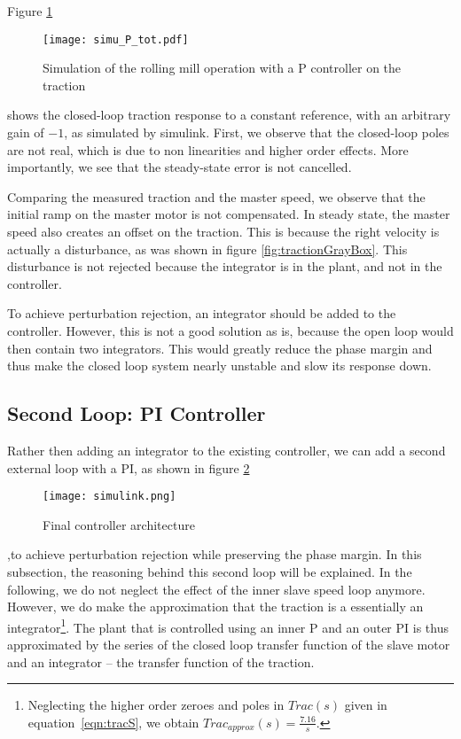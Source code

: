 Figure \ref{fig:simuPTot}
\begin{figure}[htbp]
  \centering
  \texttt{[image: simu\_P\_tot.pdf]}
  \caption{Simulation of the rolling mill operation with a P controller on the traction\label{fig:simuPTot}}
\end{figure}
shows the closed-loop traction response to a constant reference, with an arbitrary gain of $-1$, as simulated by simulink. First, we observe that the closed-loop poles are not real, which is due to non linearities and higher order effects. More importantly, we see that the steady-state error is not cancelled.

Comparing the measured traction and the master speed, we observe that the initial ramp on the master motor is not compensated. In steady state, the master speed also creates an offset on the traction. This is because the right velocity is actually a disturbance, as was shown in figure \ref{fig:tractionGrayBox}. This disturbance is not rejected because the integrator is in the plant, and not in the controller.

To achieve perturbation rejection, an integrator should be added to the controller. However, this is not a good solution as is, because the open loop would then contain two integrators. This would greatly reduce the phase margin and thus make the closed loop system nearly unstable and slow its response down.

\subsection{Second Loop: PI Controller}
Rather then adding an integrator to the existing controller, we can add a second external loop with a PI, as shown in figure \ref{fig:simulinkTot}
\begin{figure}[htbp]
  \centering
  \texttt{[image: simulink.png]}
  \caption{Final controller architecture\label{fig:simulinkTot}}
\end{figure}
,to achieve perturbation rejection while preserving the phase margin. In this subsection, the reasoning behind this second loop will be explained. In the following, we do not neglect the effect of the inner slave speed loop anymore. However, we do make the approximation that the traction is a essentially an integrator\footnote{Neglecting the higher order zeroes and poles in $Trac(s)$ given in equation~\ref{eqn:tracS}, we obtain $Trac_{approx}(s) = \frac{7.16}{s}$.}. The plant that is controlled using an inner P and an outer PI is thus approximated by the series of the closed loop transfer function of the slave motor and an integrator -- the transfer function of the traction.

